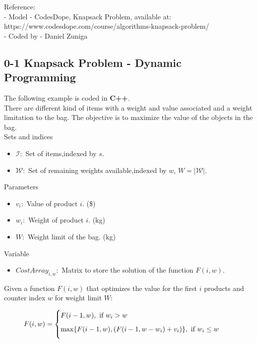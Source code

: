 \documentclass[10pt,bezier]{article}
\begin{document}
\noindent Reference:\\
- Model - CodesDope, Knapsack Problem, available at: {\color{blue}https://www.codesdope.com/course/algorithms-knapsack-problem/}\\
- Coded by - Daniel Zuniga

\newpage
\subsection{0-1 Knapsack Problem - Dynamic Programming}\label{Section7.2}
The following example is coded in {\color{blue}\textbf{C++}}.\\

There are different kind of items with a weight and value associated and a weight limitation to the bag. The objective is to maximize the value of the objects in the bag.\\

\noindent Sets and indices
\begin{itemize}
  \item $\mathcal{I}$:~Set of items,indexed by $s$.
  \item $\mathcal{W}$:~Set of remaining weights available,indexed by $w$, $W = |\mathcal{W}|$.
\end{itemize}
Parameters
\begin{itemize}
    \item $v_i$:~Value of product $i$. (\$)
    \item $w_i$:~Weight of product $i$. (kg)
    \item $W$:~Weight limit of the bag. (kg)
\end{itemize}
Variable
\begin{itemize}
    \item $CostArray_{i,w}$:~Matrix to store the solution of the function $F(i,w)$.\\
\end{itemize}


Given a function $F(i,w)$ that optimizes the value for the first $i$ products and counter index $w$ for weight limit $W$:

\begin{subequations}\label{KPDP}
    \begin{align}
    & F(i,w) =
    \begin{cases}
        \vspace{0.2cm} F(i-1,w), \text{ if } w_i > w\\
        \vspace{0.2cm} \max\{F(i-1,w),(F(i-1,w-w_i)+v_i)\}, \text{ if } w_i \leq w
    \end{cases} \label{KPDP1}
    \end{align}
\end{subequations}
\end{document}
